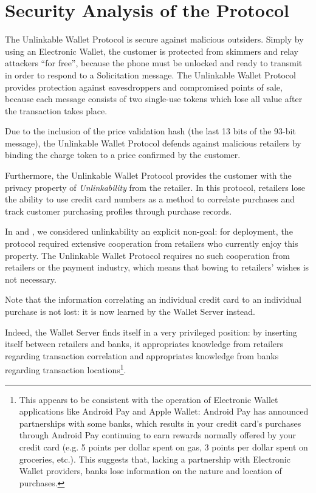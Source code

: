 \section{Security Analysis of the Protocol}
\label{sec:analysis}

The Unlinkable Wallet Protocol is secure against malicious outsiders.
Simply by using an Electronic Wallet, the customer is protected from skimmers and relay attackers ``for free'',
    because the phone must be unlocked and ready to transmit in order to respond to a Solicitation message.
The Unlinkable Wallet Protocol provides protection against eavesdroppers and compromised points of sale,
    because each message consists of two single-use tokens which lose all value after the transaction takes place.

Due to the inclusion of the price validation hash (the last 13 bits of the 93-bit message),
    the Unlinkable Wallet Protocol defends against malicious retailers by binding the charge token to a price confirmed by the customer.

Furthermore, the Unlinkable Wallet Protocol provides the customer with the privacy property of \emph{Unlinkability} from the retailer.
In this protocol, retailers lose the ability to use credit card numbers as a method to correlate purchases and track customer purchasing profiles through purchase records.

In \cite{jensen1} and \cite{jensen2}, we considered unlinkability an explicit non-goal:
  for deployment, the protocol required extensive cooperation from retailers who currently enjoy this property.
The Unlinkable Wallet Protocol requires no such cooperation from retailers or the payment industry,
    which means that bowing to retailers' wishes is not necessary.

Note that the information correlating an individual credit card to an individual purchase is not lost:
    it is now learned by the Wallet Server instead.

Indeed, the Wallet Server finds itself in a very privileged position:
    by inserting itself between retailers and banks, it appropriates knowledge from retailers regarding transaction correlation
    and appropriates knowledge from banks regarding transaction locations\footnote{
This appears to be consistent with the operation of Electronic Wallet applications like Android Pay and Apple Wallet:
    Android Pay has announced partnerships with some banks,
    which results in your credit card's purchases through Android Pay continuing to earn rewards normally offered by your credit card
    (e.g. 5 points per dollar spent on gas, 3 points per dollar spent on groceries, etc.).
    This suggests that, lacking a partnership with Electronic Wallet providers, banks lose information on the nature and location of purchases.}.

